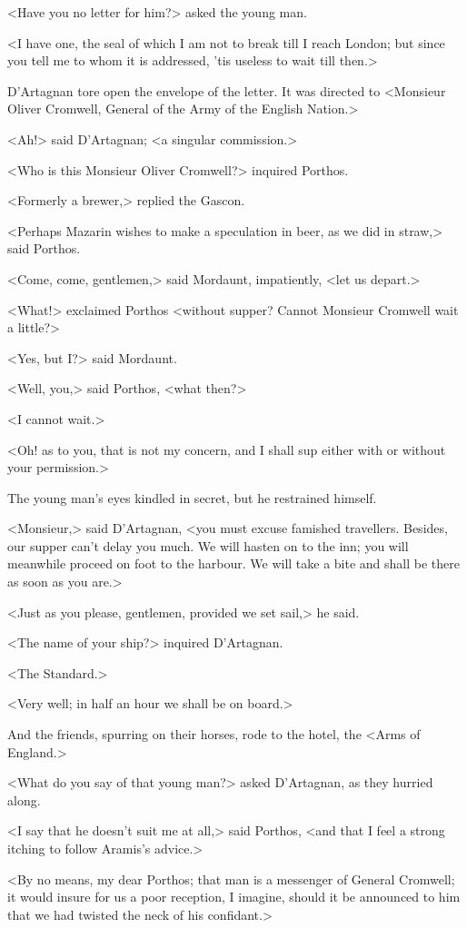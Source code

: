 <Have you no letter for him?> asked the young man.

<I have one, the seal of which I am not to break till I reach London; but since you tell me to whom it is addressed, 'tis useless to wait till then.>

D'Artagnan tore open the envelope of the letter. It was directed to <Monsieur Oliver Cromwell, General of the Army of the English Nation.>

<Ah!> said D'Artagnan; <a singular commission.>

<Who is this Monsieur Oliver Cromwell?> inquired Porthos.

<Formerly a brewer,> replied the Gascon.

<Perhaps Mazarin wishes to make a speculation in beer, as we did in straw,> said Porthos.

<Come, come, gentlemen,> said Mordaunt, impatiently, <let us depart.>

<What!> exclaimed Porthos <without supper? Cannot Monsieur Cromwell wait a little?>

<Yes, but I?> said Mordaunt.

<Well, you,> said Porthos, <what then?>

<I cannot wait.>

<Oh! as to you, that is not my concern, and I shall sup either with or without your permission.>

The young man's eyes kindled in secret, but he restrained himself.

<Monsieur,> said D'Artagnan, <you must excuse famished travellers. Besides, our supper can't delay you much. We will hasten on to the inn; you will meanwhile proceed on foot to the harbour. We will take a bite and shall be there as soon as you are.>

<Just as you please, gentlemen, provided we set sail,> he said.

<The name of your ship?> inquired D'Artagnan.

<The Standard.>

<Very well; in half an hour we shall be on board.>

And the friends, spurring on their horses, rode to the hotel, the <Arms of England.>

<What do you say of that young man?> asked D'Artagnan, as they hurried along.

<I say that he doesn't suit me at all,> said Porthos, <and that I feel a strong itching to follow Aramis's advice.>

<By no means, my dear Porthos; that man is a messenger of General Cromwell; it would insure for us a poor reception, I imagine, should it be announced to him that we had twisted the neck of his confidant.>

